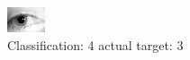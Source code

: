 \begin{figure}[h!]
\begin{center}
\includegraphics[width=0.60\columnwidth]{figures/ID1269_class_4_target_3.png}
\end{center}
\caption{ Classification: 4 actual target: 3}
\label{fig:ID1269_class_4_target_3}
\end{figure}
